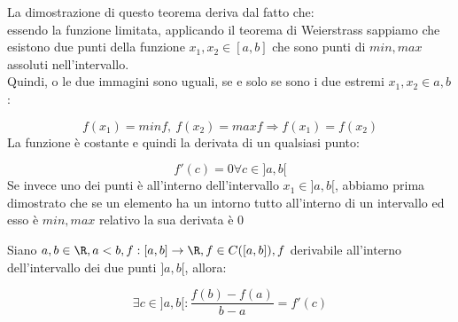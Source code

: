 \documentclass[../analisi.tex]{subfiles}
\begin{document}
\begin{dimo}
	La dimostrazione di questo teorema deriva dal fatto che:\\
	essendo la funzione limitata, applicando il teorema di Weierstrass
	sappiamo che esistono due punti della funzione $ x_1, x_2 \in [ a,b ] $
	che sono punti di $ min, max $ assoluti nell'intervallo.\\
	Quindi, o le due immagini sono uguali, se e solo se
	sono i due estremi $ x_1, x_2 \in { a,b } $:

	\begin{equation}
		f ( x_1 ) = min f,\ f ( x_2 ) = max f \Longrightarrow
		f ( x_1 ) = f ( x_2 ) 
	\end{equation}
	La funzione è costante e quindi la derivata di un qualsiasi punto:

	\begin{equation}
		f'(c) = 0 \forall c \in ]a,b[
	\end{equation}
	Se invece uno dei punti è all'interno dell'intervallo
	$ x_1 \in ]a,b[ $, abbiamo prima dimostrato che se un elemento 
	ha un intorno tutto all'interno di un intervallo ed esso
	è $ min,max $ relativo la sua derivata è 0

\end{dimo}

\begin{defn}
Siano $ a,b \in \R, a < b, f: [ a,b ]  \to \R, f \in C ( [ a,b ]  ), f  $ derivabile
all'interno dell'intervallo dei due punti $ ]a,b[ $, allora:

\begin{equation}
	\exists c \in ]a,b[ : \frac{f ( b ) - f ( a ) }{b-a} = f' ( c )  
\end{equation}

\end{defn}
\end{document}
